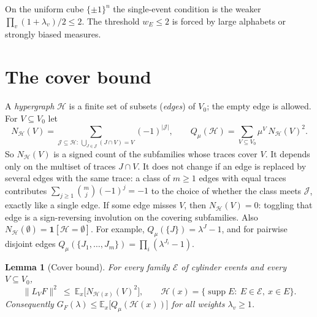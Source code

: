 \documentclass[11pt,reqno]{amsart}
\newtheorem{lemma}[theorem]{Lemma}
\theoremstyle{definition}
\newcommand{\E}{\mathbb E}
\newcommand{\supp}{\operatorname{supp}}
\newcommand{\Ho}{\mathcal H}
\newcommand{\cE}{\mathcal E}
\newcommand{\cJ}{\mathcal J}
\begin{document}
On the uniform cube $\{\pm1\}^n$ the single-event condition is the weaker
$\prod_v(1+\lambda_v)/2\le2$.  The threshold $w_E\le2$ is forced by large
alphabets or strongly biased measures.

\section{The cover bound}\label{sec:cover}

A \emph{hypergraph} $\Ho$ is a finite set of subsets (\emph{edges}) of $V_0$; the
empty edge is allowed.  For $V\subseteq V_0$ let
\[
 N_\Ho(V)=\sum_{\cJ\subseteq\Ho:\ \bigcup_{J\in\cJ}(J\cap V)=V}(-1)^{|\cJ|},\qquad
 Q_\mu(\Ho)=\sum_{V\subseteq V_0}\mu^V\,N_\Ho(V)^2 .
\]
So $N_\Ho(V)$ is a signed count of the subfamilies whose traces cover $V$.  It
depends only on the multiset of traces $J\cap V$.  It does not change if an
edge is replaced by several edges with the same trace: a class of $m\ge1$
edges with equal traces contributes $\sum_{j\ge1}\binom mj(-1)^j=-1$ to the choice
of whether the class meets $\cJ$, exactly like a single edge.  If some edge
misses $V$, then $N_\Ho(V)=0$: toggling that edge is a sign-reversing
involution on the covering subfamilies.  Also $N_\Ho(\emptyset)=\mathbf 1[\Ho=\emptyset]$.
For example, $Q_\mu(\{J\})=\lambda^J-1$, and for pairwise disjoint edges
$Q_\mu(\{J_1,\dots,J_m\})=\prod_i(\lambda^{J_i}-1)$.

\begin{lemma}[Cover bound]\label{lem:cover}
For every family $\cE$ of cylinder events and every $V\subseteq V_0$,
\[
 \|L_VF\|^2\ \le\ \E_x\big[N_{\Ho(x)}(V)^2\big],\qquad
 \Ho(x)=\{\supp E:\ E\in\cE,\ x\in E\}.
\]
Consequently $G_F(\lambda)\le\E_x\big[Q_\mu(\Ho(x))\big]$ for all weights $\lambda_v\ge1$.
\end{lemma}
\end{document}
